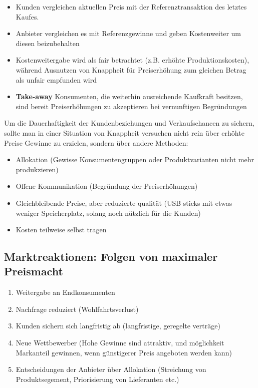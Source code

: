 \begin{itemize}
    \item Kunden vergleichen aktuellen Preis mit der Referenztransaktion des letztes Kaufes.
    \item Anbieter vergleichen es mit Referenzgewinne und geben Kostenweiter um diesen beizubehalten
    \item Kostenweitergabe wird als fair betrachtet (z.B. erhöhte Produktionskosten), während Ausnutzen von Knappheit für Preiserhöhung zum gleichen Betrag als unfair empfunden wird 
    \item \textbf{Take-away} Konsumenten, die weiterhin ausreichende Kaufkraft besitzen, sind bereit Preiserhöhungen zu akzeptieren bei vernunftigen Begründungen 
\end{itemize}
\pagebreak
Um die Dauerhaftigkeit der Kundenbeziehungen und Verkaufschancen zu sichern, sollte man in einer Situation von Knappheit versuchen nicht rein über erhöhte Preise Gewinne zu erzielen, sondern über andere Methoden:
\begin{itemize}
    \item Allokation (Gewisse Konsumentengruppen oder Produktvarianten nicht mehr produkzieren)
    \item Offene Kommunikation (Begründung der Preiserhöhungen)
    \item Gleichbleibende Preise, aber reduzierte qualität (USB sticks mit etwas weniger Speicherplatz, solang noch nützlich für die Kunden)
    \item Kosten teilweise selbst tragen
\end{itemize}

\subsection{Marktreaktionen: Folgen von maximaler Preismacht}

\begin{enumerate}
    \item Weitergabe an Endkonsumenten      
    \item Nachfrage reduziert (Wohlfahrtsverlust)
    \item Kunden sichern sich langfristig ab (langfristige, geregelte verträge)
    \item Neue Wettbewerber (Hohe Gewinne sind attraktiv, und möglichkeit Markanteil gewinnen, wenn günstigerer Preis angeboten werden kann)
    \item Entscheidungen der Anbieter über Allokation (Streichung von Produktsegement, Priorisierung von Lieferanten etc.)  
\end{enumerate}

